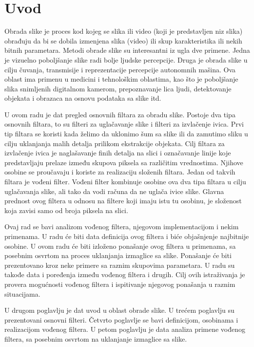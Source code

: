 \documentclass[a4paper,12pt,titlepage]{article}
\begin{document}

\section{Uvod}%

Obrada slike je proces kod kojeg se slika ili video (koji je predstavljen niz slika) obrađuju da bi se dobila izmenjena slika (video) ili skup karakteristika ili nekih bitnih parametara. Metodi obrade slike su interesantni iz ugla dve primene. Jedna je vizuelno poboljšanje slike radi bolje ljudske percepcije. Druga je obrada slike u cilju čuvanja, transmisije i reprezentacije percepcije autonomnih mašina. Ova oblast ima primenu u medicini i tehnološkim oblastima, kao što je poboljšanje slika snimljenih digitalnom kamerom, prepoznavanje lica ljudi, detektovanje objekata i obrazaca na osnovu podataka sa slike itd. 

U ovom radu je dat pregled osnovnih filtara za obradu slike. Postoje dva tipa osnovnih filtara, to su filteri za uglačavanje slike i filteri za izvlačenje ivica. Prvi tip filtara se koristi kada želimo da uklonimo šum sa slike ili da zamutimo sliku u cilju uklanjanja malih detalja prilikom ekstrakcije objekata. Cilj filtara za izvlačenje ivica je naglašavanje finih detalja na slici i označavanje linije koje predstavljaju prelaze između skupova piksela sa različitim vrednostima. Njihove osobine se proučavaju i koriste za realizaciju složenih filtara. Jedan od takvih filtara je vođeni filter. Vođeni filter kombinuje osobine ova dva tipa filtara u cilju uglačavanja slike, ali tako da vodi računa da ne uglača ivice slike. Glavna prednost ovog filtera u odnosu na filtere koji imaju istu tu osobinu, je složenost koja zavisi samo od broja piksela na slici. 

Ovaj rad se bavi analizom vođenog filtera, njegovom implementacijom i nekim primenama. U radu će biti data definicija ovog filtera i biće objašnjenje najbitnije osobine. U ovom radu će biti izloženo ponašanje ovog filtera u primenama, sa posebnim osvrtom na proces uklanjanja izmaglice sa slike. Ponašanje će biti prezentovano kroz neke primere sa raznim skupovima parametara. U radu su takođe data i poređenja između vođenog filtera i drugih. Cilj ovih istraživanja je provera mogućnosti vođenog filtera i ispitivanje njegovog ponašanja u raznim situacijama. 

U drugom poglavlju je dat uvod u oblast obrade slike. U trećem poglavlju su prezentovani osnovni filteri. Četvrto poglavlje se bavi definicijom, osobinama i realizacijom vođenog filtera. U petom poglavlju je data analiza primene vođenog filtera, sa posebnim osvrtom na uklanjanje izmaglice sa slike.
\end{document}
